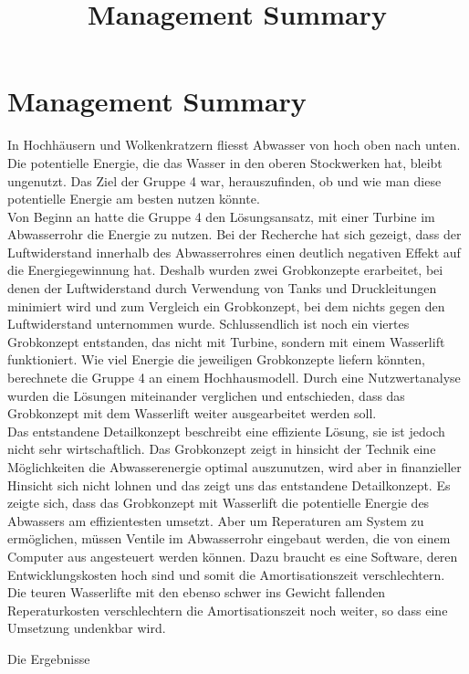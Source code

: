 \documentclass[12pt]{article}
\title{Management Summary}
\begin{document}
\section*{Management Summary}
In Hochhäusern und Wolkenkratzern fliesst Abwasser von hoch oben nach unten. Die potentielle Energie, die das Wasser in den oberen Stockwerken hat, bleibt ungenutzt. Das Ziel der Gruppe 4 war, herauszufinden, ob und wie man diese potentielle Energie am besten nutzen könnte.\\


Von Beginn an hatte die Gruppe 4 den Lösungsansatz, mit einer Turbine im Abwasserrohr die Energie zu nutzen. Bei der Recherche hat sich gezeigt, dass der Luftwiderstand innerhalb des Abwasserrohres einen deutlich negativen Effekt auf die Energiegewinnung hat. Deshalb wurden zwei Grobkonzepte erarbeitet, bei denen der Luftwiderstand durch Verwendung von Tanks und Druckleitungen minimiert wird und zum Vergleich ein Grobkonzept, bei dem nichts gegen den Luftwiderstand unternommen wurde. Schlussendlich ist noch ein viertes Grobkonzept entstanden, das nicht mit Turbine, sondern mit einem Wasserlift funktioniert. Wie viel Energie die jeweiligen Grobkonzepte liefern könnten, berechnete die Gruppe 4 an einem Hochhausmodell. Durch eine Nutzwertanalyse wurden die Lösungen miteinander verglichen und entschieden, dass das Grobkonzept mit dem Wasserlift weiter ausgearbeitet werden soll.\\


Das entstandene Detailkonzept beschreibt eine effiziente Lösung, sie ist jedoch nicht sehr wirtschaftlich. 
Das Grobkonzept zeigt in hinsicht der Technik eine Möglichkeiten die Abwasserenergie optimal auszunutzen, wird aber in finanzieller Hinsicht sich nicht lohnen und das zeigt uns das entstandene Detailkonzept.
Es zeigte sich, dass das Grobkonzept mit Wasserlift die potentielle Energie des Abwassers am effizientesten umsetzt. Aber um Reperaturen am System zu ermöglichen, müssen Ventile im Abwasserrohr eingebaut werden, die von einem Computer aus angesteuert werden können. Dazu braucht es eine Software, deren Entwicklungskosten hoch sind und somit die Amortisationszeit verschlechtern. Die teuren Wasserlifte mit den ebenso schwer ins Gewicht fallenden Reperaturkosten verschlechtern die Amortisationszeit noch weiter, so dass eine Umsetzung undenkbar wird.


Die Ergebnisse 
\end{document}
